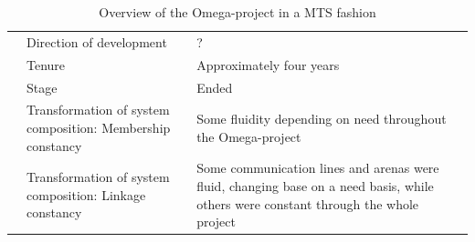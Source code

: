 \begin{table}[H]
\begin{adjustwidth}{-1.15cm}{}
\begin{tabular}{ | p{2.7cm} | p{5cm} | p{9cm} | }
 	& Direction of development & ? \\ \cline{2-3}
	& Tenure & Approximately four years \\ \cline{2-3}
	& Stage & Ended \\ \cline{2-3}
	& Transformation of system composition: Membership constancy & Some fluidity depending on need throughout the Omega-project \\ \cline{2-3}
	& Transformation of system composition: Linkage constancy & Some communication lines and arenas were fluid, changing base on a need basis, while others were constant through the whole project \\ \cline{2-3}
	\hline
\end{tabular}
\caption{Overview of the Omega-project in a MTS fashion}
\label{ootopiamf}
\end{adjustwidth}
\end{table}

